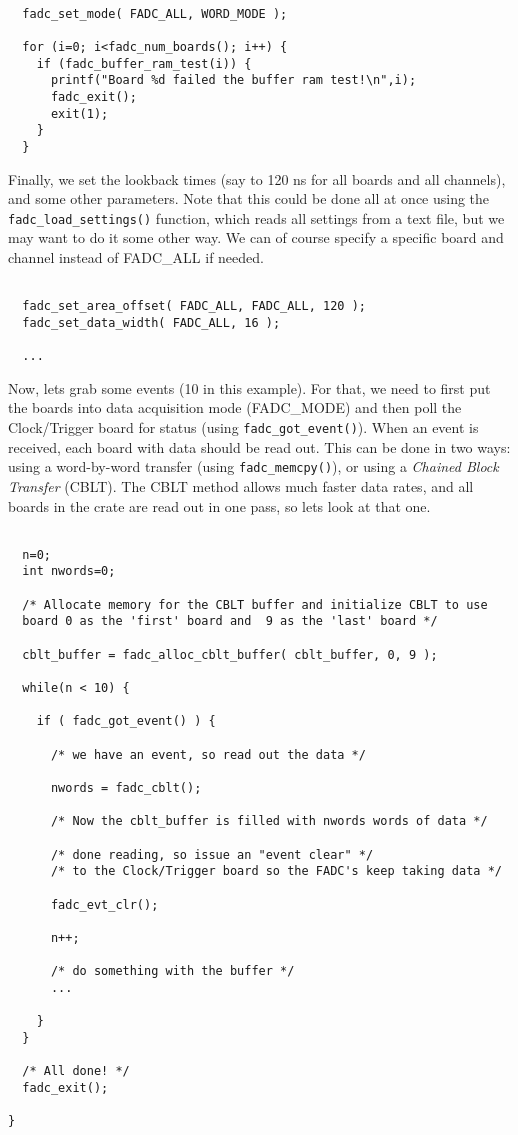 \documentclass{article}
\newcommand{\F}[1]{\texttt{#1}}
\begin{document}
\begin{verbatim}

  fadc_set_mode( FADC_ALL, WORD_MODE );

  for (i=0; i<fadc_num_boards(); i++) {
    if (fadc_buffer_ram_test(i)) {
      printf("Board %d failed the buffer ram test!\n",i);
      fadc_exit();
      exit(1);
    }
  }
\end{verbatim}

Finally, we set the lookback times (say to 120 ns for all boards and
all channels), and some other parameters. Note that this could be done
all at once using the \F{fadc\_load\_settings()} function, which
reads all settings from a text file, but we may want to do it some
other way. We can of course specify a specific board and channel
instead of FADC\_ALL if needed.

\begin{verbatim}

  fadc_set_area_offset( FADC_ALL, FADC_ALL, 120 );
  fadc_set_data_width( FADC_ALL, 16 );

  ...

\end{verbatim}

Now, lets grab some events (10 in this example).  For that, we need to
first put the boards into data acquisition mode (FADC\_MODE) and then
poll the Clock/Trigger board for status (using
\F{fadc\_got\_event()}).  When an event is received, each board with
data should be read out.  This can be done in two ways: using a
word-by-word transfer (using \F{fadc\_memcpy()}), or using a
\emph{Chained Block Transfer} (CBLT).  The CBLT method allows much
faster data rates, and all boards in the crate are read out in one
pass, so lets look at that one.

\begin{verbatim}

  n=0;
  int nwords=0;

  /* Allocate memory for the CBLT buffer and initialize CBLT to use
  board 0 as the 'first' board and  9 as the 'last' board */
  
  cblt_buffer = fadc_alloc_cblt_buffer( cblt_buffer, 0, 9 );

  while(n < 10) {
    
    if ( fadc_got_event() ) {

      /* we have an event, so read out the data */
    
      nwords = fadc_cblt();

      /* Now the cblt_buffer is filled with nwords words of data */
      
      /* done reading, so issue an "event clear" */
      /* to the Clock/Trigger board so the FADC's keep taking data */
      
      fadc_evt_clr();

      n++;

      /* do something with the buffer */
      ...
      
    }
  }

  /* All done! */
  fadc_exit();

}

\end{verbatim}
\end{document}
